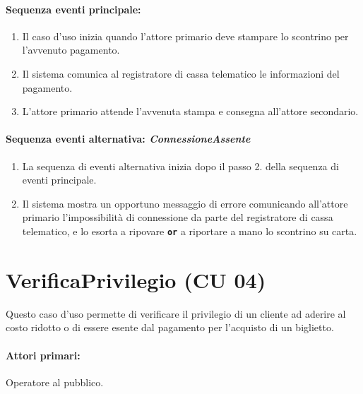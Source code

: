 \documentclass{article}
\begin{document}
	\paragraph{Sequenza eventi principale:}
\begin{enumerate}[itemsep=8pt,parsep=0pt]

    \item Il caso d'uso inizia quando l'attore primario deve stampare lo scontrino per l'avvenuto pagamento.

    \item Il sistema comunica al registratore di cassa telematico le informazioni del pagamento.

	\item L'attore primario attende l'avvenuta stampa e consegna all'attore secondario.
    

\end{enumerate}

	\paragraph{Sequenza eventi alternativa: \emph{ConnessioneAssente}}
		\begin{enumerate}[itemsep=8pt,parsep=0pt]
				\item La sequenza di eventi alternativa inizia dopo il passo 2. della sequenza di eventi principale.
				\item Il sistema mostra un opportuno messaggio di errore comunicando all'attore primario l'impossibilità di connessione da parte del registratore di cassa telematico, e lo esorta a ripovare \texttt{\textbf{or}} a riportare a mano lo scontrino su carta.
		\end{enumerate}




	
\newpage
    
\section*{VerificaPrivilegio (CU 04)}

    \indent\indent Questo caso d'uso permette di verificare il privilegio di un cliente ad aderire al costo ridotto o di essere esente dal pagamento per l'acquisto di un biglietto.
    
    \paragraph{Attori primari:}Operatore al pubblico.
	
\end{document}
